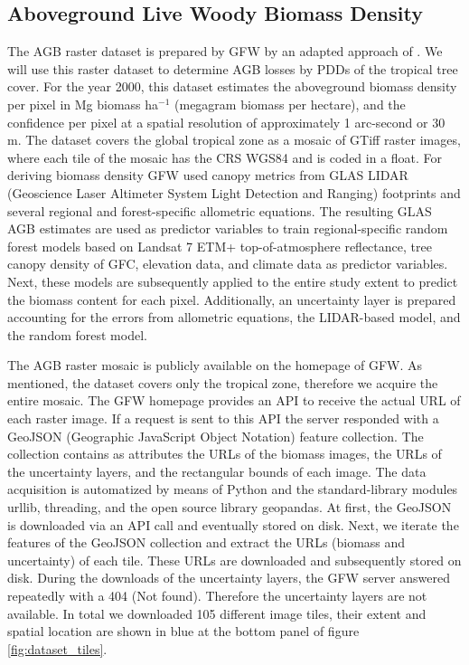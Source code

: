 	\subsection{Aboveground Live Woody Biomass Density}
		The \ac{AGB} raster dataset is prepared by \ac{GFW} by an adapted approach of \citet{Baccini2012,Baccini2015,Baccini2017}. We will use this raster dataset to determine \ac{AGB} losses by \acp{PDD} of the tropical tree cover. For the year 2000, this dataset estimates the aboveground biomass density per pixel in Mg biomass ha$^{-1}$ (megagram biomass per hectare), and the confidence per pixel at a spatial resolution of approximately 1 arc-second or 30 m. The dataset covers the global tropical zone as a mosaic of \ac{GTiff} raster images, where each tile of the mosaic has the \ac{CRS} \ac{WGS84} and is coded in a float. For deriving biomass density \ac{GFW} used canopy metrics from GLAS LIDAR (Geoscience Laser Altimeter System Light Detection and Ranging) footprints and several regional and forest-specific allometric equations. The resulting GLAS \ac{AGB} estimates are used as predictor variables to train regional-specific random forest models based on Landsat 7 ETM+ top-of-atmosphere reflectance, tree canopy density of \ac{GFC}, elevation data, and climate data as predictor variables. Next, these models are subsequently applied to the entire study extent to predict the biomass content for each pixel. Additionally, an uncertainty layer is prepared accounting for the errors from allometric equations, the LIDAR-based model, and the random forest model.

		The \ac{AGB} raster mosaic is publicly available on the homepage of \ac{GFW}. As mentioned, the dataset covers only the tropical zone, therefore we acquire the entire mosaic. The \ac{GFW} homepage provides an \ac{API} to receive the actual \ac{URL} of each raster image. If a request is sent to this \ac{API} the server responded with a GeoJSON (Geographic JavaScript Object Notation) feature collection. The collection contains as attributes the \acp{URL} of the biomass images, the \acp{URL} of the uncertainty layers, and the rectangular bounds of each image. The data acquisition is automatized by means of Python and the standard-library modules urllib, threading, and the open source library geopandas. At first, the GeoJSON is downloaded via an \ac{API} call and eventually stored on disk. Next, we iterate the features of the GeoJSON collection and extract the \ac{URL}s (biomass and uncertainty) of each tile. These \ac{URL}s are downloaded and subsequently stored on disk. During the downloads of the uncertainty layers, the \ac{GFW} server answered repeatedly with a 404 (Not found). Therefore the uncertainty layers are not available. In total we downloaded 105 different image tiles, their extent and spatial location are shown in blue at the bottom panel of figure \ref{fig:dataset_tiles}.

